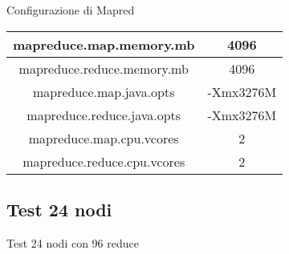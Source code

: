 Configurazione di Mapred

\begin{center}
\begin{tabular}{ | c | c |} 
\hline
mapreduce.map.memory.mb & 4096 \\ 
\hline
mapreduce.reduce.memory.mb & 4096 \\ 
\hline
mapreduce.map.java.opts & -Xmx3276M \\
\hline
mapreduce.reduce.java.opts & -Xmx3276M \\ 
\hline
mapreduce.map.cpu.vcores & 2 \\
\hline
mapreduce.reduce.cpu.vcores & 2 \\
\hline
\end{tabular}
\end{center}

\subsection{Test 24 nodi}

Test 24 nodi con 96 reduce
